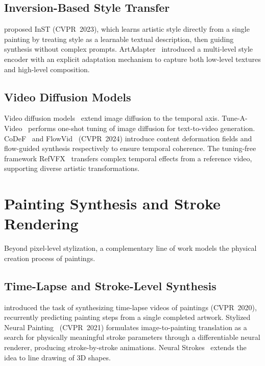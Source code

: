 \documentclass[letterpaper,twocolumn,10pt]{article}
\begin{document}
\subsection{Inversion-Based Style Transfer}

\citet{zhang2023inversion} proposed InST (CVPR~2023), which learns artistic style directly
from a single painting by treating style as a learnable textual description, then guiding
synthesis without complex prompts. ArtAdapter~\cite{chen2024artadapter} introduced a
multi-level style encoder with an explicit adaptation mechanism to capture both low-level
textures and high-level composition.

\subsection{Video Diffusion Models}

Video diffusion models~\cite{ho2022video,blattmann2023svd} extend image diffusion to the
temporal axis. Tune-A-Video~\cite{wu2023tuneavideo} performs one-shot tuning of image
diffusion for text-to-video generation. CoDeF~\cite{ouyang2024codef} and
FlowVid~\cite{liang2024flowvid} (CVPR~2024) introduce content deformation fields and
flow-guided synthesis respectively to ensure temporal coherence. The tuning-free
framework RefVFX~\cite{jones2026refvfx} transfers complex temporal effects from a
reference video, supporting diverse artistic transformations.

\section{Painting Synthesis and Stroke Rendering}
\label{sec:painting}

Beyond pixel-level stylization, a complementary line of work models the physical creation
process of paintings.

\subsection{Time-Lapse and Stroke-Level Synthesis}

\citet{zhao2020painting} introduced the task of synthesizing time-lapse videos of
paintings (CVPR~2020), recurrently predicting painting steps from a single completed
artwork. Stylized Neural Painting~\cite{zou2021stylized} (CVPR~2021) formulates
image-to-painting translation as a search for physically meaningful stroke parameters
through a differentiable neural renderer, producing stroke-by-stroke animations.
Neural Strokes~\cite{liu2021neuralstrokes} extends the idea to line drawing of 3D shapes.
\end{document}
